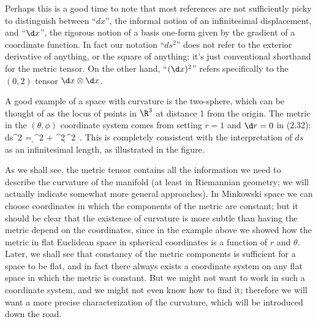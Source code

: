 Perhaps this is a good time to note that most references are not
sufficiently picky to distinguish between
``$dx$'', the informal notion of an infinitesimal displacement, and
``$\d x$'', the rigorous notion of a basis one-form given by the
gradient of a coordinate function.  In fact our notation ``$ds^2$''
does not refer to the exterior derivative of anything, or the square
of anything; it's just conventional shorthand for the metric tensor.
On the other hand, ``$(\d x)^2$'' refers specifically to the $(0,2)$
tensor $\d x\otimes\d x$.

A good example of a
space with curvature is the two-sphere, which can be thought of
as the locus of points in $\R^3$ at distance 1 from the origin.  The 
metric in the $(\theta, \phi)$ coordinate system comes from setting $r=1$
and $\d r=0$ in (2.32):
\be
  ds^2 = \d\theta^2 + \sin^2\theta\,\d \phi^2\ .\label{2.33}
\ee
This is completely consistent with the interpretation of $ds$ as an
infinitesimal length, as illustrated in the figure.

\begin{figure}
  \centerline{
  }
\end{figure}

As we shall see, the metric tensor contains all the information we need
to describe the curvature of the manifold (at least in Riemannian
geometry; we will actually indicate somewhat more general approaches).
In Minkowski space we can choose coordinates in which the components of
the metric are constant; but it should be clear that the existence of 
curvature is more subtle than having the metric depend on the coordinates,
since in the example above we showed how the metric in flat Euclidean
space in spherical coordinates is a function of $r$ and $\theta$.  Later,
we shall see that constancy of the metric components is sufficient
for a space to be flat, and in fact there always exists a coordinate 
system on any flat space in which the metric is constant.  But we might
not want to work in such a coordinate system, and we might not even 
know how to find it; therefore we will want a more precise characterization
of the curvature, which will be introduced down the road.

